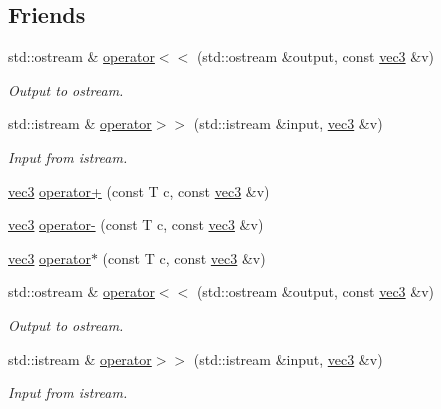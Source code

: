 \subsection*{Friends}
\begin{DoxyCompactItemize}
\item 
std\+::ostream \& \mbox{\hyperlink{struct_space_h_1_1vec3_af5e1bcad9d3d484d6f4e6b3f8949f5cf}{operator$<$$<$}} (std\+::ostream \&output, const \mbox{\hyperlink{struct_space_h_1_1vec3}{vec3}} \&v)
\begin{DoxyCompactList}\small\item\em Output to ostream. \end{DoxyCompactList}\item 
std\+::istream \& \mbox{\hyperlink{struct_space_h_1_1vec3_a72f92578884bd68e0747871acd8545fd}{operator$>$$>$}} (std\+::istream \&input, \mbox{\hyperlink{struct_space_h_1_1vec3}{vec3}} \&v)
\begin{DoxyCompactList}\small\item\em Input from istream. \end{DoxyCompactList}\item 
\mbox{\hyperlink{struct_space_h_1_1vec3}{vec3}} \mbox{\hyperlink{struct_space_h_1_1vec3_a04165a00cae4ce5d2f5e142cc177a720}{operator+}} (const T c, const \mbox{\hyperlink{struct_space_h_1_1vec3}{vec3}} \&v)
\item 
\mbox{\hyperlink{struct_space_h_1_1vec3}{vec3}} \mbox{\hyperlink{struct_space_h_1_1vec3_a6252e85a538cca25b99107166be778b1}{operator-\/}} (const T c, const \mbox{\hyperlink{struct_space_h_1_1vec3}{vec3}} \&v)
\item 
\mbox{\hyperlink{struct_space_h_1_1vec3}{vec3}} \mbox{\hyperlink{struct_space_h_1_1vec3_a4f0b2685679a321b6c43a7406719c3a5}{operator$\ast$}} (const T c, const \mbox{\hyperlink{struct_space_h_1_1vec3}{vec3}} \&v)
\item 
std\+::ostream \& \mbox{\hyperlink{struct_space_h_1_1vec3_af5e1bcad9d3d484d6f4e6b3f8949f5cf}{operator$<$$<$}} (std\+::ostream \&output, const \mbox{\hyperlink{struct_space_h_1_1vec3}{vec3}} \&v)
\begin{DoxyCompactList}\small\item\em Output to ostream. \end{DoxyCompactList}\item 
std\+::istream \& \mbox{\hyperlink{struct_space_h_1_1vec3_a72f92578884bd68e0747871acd8545fd}{operator$>$$>$}} (std\+::istream \&input, \mbox{\hyperlink{struct_space_h_1_1vec3}{vec3}} \&v)
\begin{DoxyCompactList}\small\item\em Input from istream. \end{DoxyCompactList}\item 

\end{DoxyCompactItemize}
